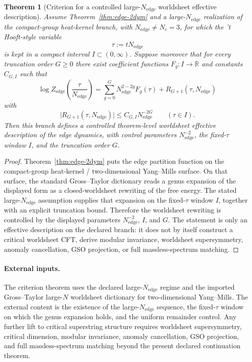 \documentclass[11pt]{article}
\newtheorem{theorem}{Theorem}[section]
\begin{document}
\begin{theorem}[Criterion for a controlled large-$N_{\mathrm{edge}}$ worldsheet effective description]\label{thm:worldsheet-largeN}
Assume Theorem~\ref{thm:edge-2dym} and a large-$N_{\mathrm{edge}}$
realization of the compact-group heat-kernel branch, with \(N_{\mathrm{edge}}\neq N_c=3\), for
which the 't Hooft-style variable
\[
\tau:=tN_{\mathrm{edge}}
\]
is kept in a compact interval \(I\subset (0,\infty)\). Suppose moreover that for every truncation
order \(G\ge 0\) there exist coefficient functions \(F_g:I\to\mathbb R\) and constants
\(C_{G,I}\) such that
\[
\log Z_{\mathrm{edge}}\!\left(\frac{\tau}{N_{\mathrm{edge}}}\right)
=
\sum_{g=0}^{G} N_{\mathrm{edge}}^{2-2g} F_g(\tau)
+
R_{G+1}(\tau,N_{\mathrm{edge}})
\]
with
\[
\bigl|R_{G+1}(\tau,N_{\mathrm{edge}})\bigr|
\le
C_{G,I}N_{\mathrm{edge}}^{-2G}
\qquad(\tau\in I).
\]
Then this branch defines a controlled theorem-level worldsheet effective description of the edge
dynamics, with control parameters \(N_{\mathrm{edge}}^{-2}\), the fixed-\(\tau\) window \(I\),
and the truncation order \(G\).
\end{theorem}

\begin{proof}
Theorem~\ref{thm:edge-2dym} puts the edge partition function on the compact-group heat-kernel /
two-dimensional Yang--Mills surface. On that surface, the standard Gross--Taylor dictionary reads
a genus expansion of the displayed form as a closed-worldsheet rewriting of the free energy. The
stated large-\(N_{\mathrm{edge}}\) assumption supplies that expansion on the fixed-\(\tau\) window
\(I\), together with an explicit truncation bound. Therefore the worldsheet rewriting is
controlled by the displayed parameters \(N_{\mathrm{edge}}^{-2}\), \(I\), and \(G\). The
statement is only an effective description on the declared branch: it does not by itself construct
a critical worldsheet CFT, derive modular invariance, worldsheet supersymmetry, anomaly
cancellation, GSO projection, or full massless-spectrum matching.
\end{proof}

\paragraph{External inputs.}
The criterion theorem uses the declared large-\(N_{\mathrm{edge}}\) regime and the imported
Gross--Taylor large-\(N\) worldsheet dictionary for two-dimensional Yang--Mills. The external
content is the existence of the large-\(N_{\mathrm{edge}}\) sequence, the fixed-\(\tau\) window on
which the genus expansion holds, and the uniform remainder control. Any further lift to critical
superstring structure requires worldsheet supersymmetry, critical dimension, modular invariance,
anomaly cancellation, GSO projection, and full massless-spectrum matching beyond the present
declared continuation theorem.
\end{document}
